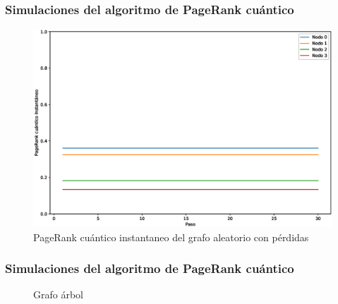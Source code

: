 \documentclass[xetex,mathserif,serif, 8pt]{beamer}
\begin{document}
\begin{frame}
    \frametitle{Simulaciones del algoritmo de PageRank cuántico}

    \begin{figure}[H]
        \centering
        \includegraphics[width=0.9\linewidth]{img/crown-inst-lossy.eps}
        \caption{PageRank cuántico instantaneo del grafo aleatorio con pérdidas}
    \end{figure}

\end{frame}




\begin{frame}
    \frametitle{Simulaciones del algoritmo de PageRank cuántico}

    \begin{figure}[H]
        \centering
        \caption[Grafo árbol]{Grafo árbol}
        \label{fig:tree}
    \end{figure}

\end{frame}
\end{document}
